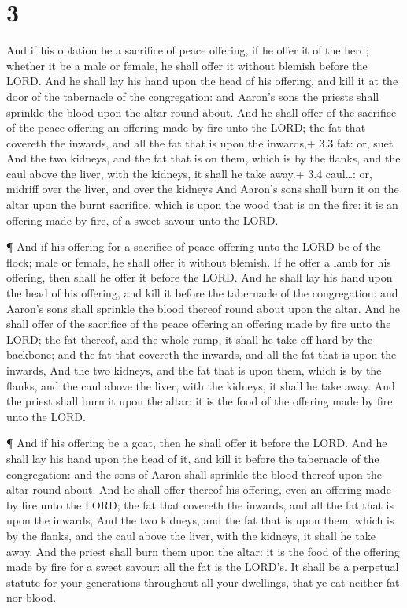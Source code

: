 \hypertarget{section-2}{%
\section{3}\label{section-2}}

 And if his oblation be a sacrifice of peace offering, if he
offer it of the herd; whether it be a male or female, he shall offer it
without blemish before the LORD.  And he shall lay his hand
upon the head of his offering, and kill it at the door of the tabernacle
of the congregation: and Aaron's sons the priests shall sprinkle the
blood upon the altar round about.  And he shall offer of the
sacrifice of the peace offering an offering made by fire unto the LORD;
the fat that covereth the inwards, and all the fat that is upon the
inwards,+ 3.3 fat: or, suet  And the two kidneys, and the
fat that is on them, which is by the flanks, and the caul above the
liver, with the kidneys, it shall he take away.+ 3.4 caul\ldots: or,
midriff over the liver, and over the kidneys  And Aaron's
sons shall burn it on the altar upon the burnt sacrifice, which is upon
the wood that is on the fire: it is an offering made by fire, of a sweet
savour unto the LORD.

 ¶ And if his offering for a sacrifice of peace offering
unto the LORD be of the flock; male or female, he shall offer it without
blemish.  If he offer a lamb for his offering, then shall he
offer it before the LORD.  And he shall lay his hand upon
the head of his offering, and kill it before the tabernacle of the
congregation: and Aaron's sons shall sprinkle the blood thereof round
about upon the altar.  And he shall offer of the sacrifice
of the peace offering an offering made by fire unto the LORD; the fat
thereof, and the whole rump, it shall he take off hard by the backbone;
and the fat that covereth the inwards, and all the fat that is upon the
inwards,  And the two kidneys, and the fat that is upon
them, which is by the flanks, and the caul above the liver, with the
kidneys, it shall he take away.  And the priest shall burn
it upon the altar: it is the food of the offering made by fire unto the
LORD.

 ¶ And if his offering be a goat, then he shall offer it
before the LORD.  And he shall lay his hand upon the head
of it, and kill it before the tabernacle of the congregation: and the
sons of Aaron shall sprinkle the blood thereof upon the altar round
about.  And he shall offer thereof his offering, even an
offering made by fire unto the LORD; the fat that covereth the inwards,
and all the fat that is upon the inwards,  And the two
kidneys, and the fat that is upon them, which is by the flanks, and the
caul above the liver, with the kidneys, it shall he take away.
 And the priest shall burn them upon the altar: it is the
food of the offering made by fire for a sweet savour: all the fat is the
LORD's.  It shall be a perpetual statute for your
generations throughout all your dwellings, that ye eat neither fat nor
blood.

